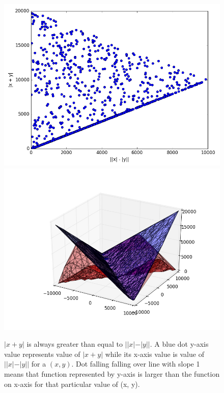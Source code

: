 \documentclass[answers,addpoints]{exam}
\begin{document}
\begin{questions}
\begin{solution}
    \begin{figure}[H]
        \includegraphics[width=1\columnwidth]{./sol2_a.py.png}
        \includegraphics[width=1\columnwidth]{./sol2_a.py_3d.png}
        \caption{ $|x+y|$ is always greater than equal to $||x|-|y||$. A blue dot y-axis
            value represents value of $|x+y|$ while its  x-axis value is value of
            $||x|-|y||$ for a $(x,y)$. Dot falling
            falling over line with slope 1 means that function represented by y-axis is
        larger than the function on x-axis for that particular value of (x, y).}
        \label{fig:2a}
    \end{figure}

\end{solution}


\end{questions}
\end{document}
